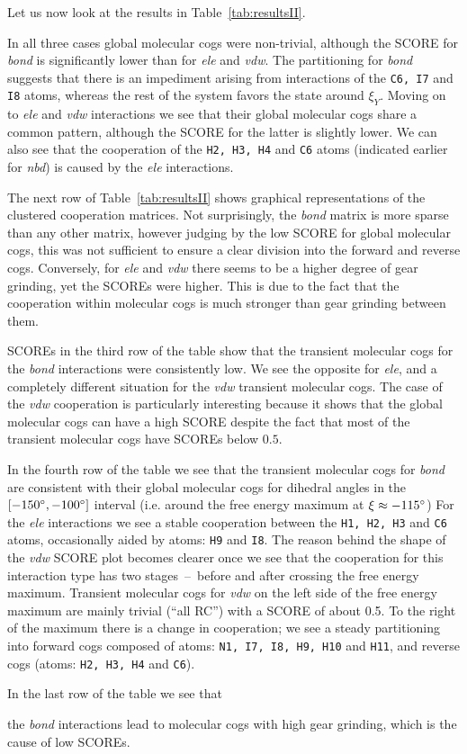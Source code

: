 \documentclass[a4paper,11pt,twoside]{book}%
\begin{document}
Let us now look at the results in Table~\ref{tab:resultsII}.
{\color{black}In all three cases global molecular cogs were non-trivial, although the SCORE for \emph{bond} is significantly lower than for \emph{ele} and \emph{vdw}.
The partitioning for \emph{bond} suggests that there is an impediment arising from interactions of the \texttt{C6, I7} and \texttt{I8} atoms, whereas the rest of the system favors the state around $\xi_Y$.
Moving on to \emph{ele} and \emph{vdw} interactions we see that their global molecular cogs share a common pattern, although the SCORE for the latter is slightly lower.
We can also see that the cooperation of the \texttt{H2, H3, H4} and \texttt{C6} atoms (indicated earlier for \emph{nbd}) is caused by the \emph{ele} interactions.

The next row of Table~\ref{tab:resultsII} shows graphical representations of the clustered cooperation matrices.
Not surprisingly, the \emph{bond} matrix is more sparse than any other matrix, however judging by the low SCORE for global molecular cogs, this was not sufficient to ensure a clear division into the forward and reverse cogs.
Conversely, for \emph{ele} and \emph{vdw} there seems to be a higher degree of gear grinding, yet the SCOREs were higher.
This is due to the fact that the cooperation within molecular cogs is much stronger than gear grinding between them.

SCOREs in the third row of the table show that the transient molecular cogs for the \emph{bond} interactions were consistently low.
We see the opposite for \emph{ele}, and a completely different situation for the \emph{vdw} transient molecular cogs.
The case of the \emph{vdw} cooperation is particularly interesting because it shows that the global molecular cogs can have a high SCORE despite the fact that most of the transient molecular cogs have SCOREs below $0.5$.

In the fourth row of the table we see that the transient molecular cogs for \emph{bond} are consistent with their global molecular cogs for dihedral angles in the $[-150\degree,-100\degree]$ interval (i.e. around the free energy maximum at $\xi\approx-115\degree$)
For the \emph{ele} interactions we see a stable cooperation between the \texttt{H1, H2, H3} and \texttt{C6} atoms, occasionally aided by atoms: \texttt{H9} and \texttt{I8}.
The reason behind the shape of the \emph{vdw} SCORE plot becomes clearer once we see that the cooperation for this interaction type has two stages~--~before and after crossing the free energy maximum.
Transient molecular cogs for \emph{vdw} on the left side of the free energy maximum are mainly trivial (``all RC'') with a SCORE of about 0.5.
To the right of the maximum there is a change in cooperation; we see a steady partitioning into forward cogs composed of atoms: \texttt{N1, I7, I8, H9, H10} and \texttt{H11}, and reverse cogs (atoms: \texttt{H2, H3, H4} and \texttt{C6}).

In the last row of the table we see that} the \emph{bond} interactions lead to molecular cogs with high gear grinding, which is the cause of low SCOREs.
\end{document}

